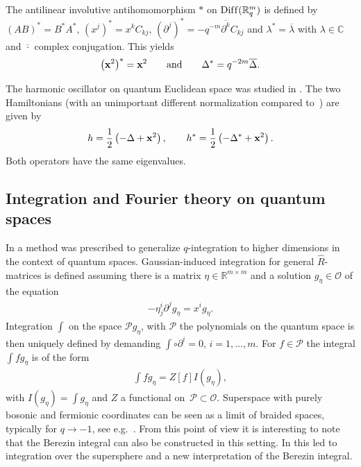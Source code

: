 \documentclass[11pt]{article}
\newcommand{\mR}{\mathbb{R}}
\newcommand{\mC}{\mathbb{C}}
\newcommand{\cP}{\mathcal{P}}
\newcommand{\cO}{\mathcal{O}}
\numberwithin{equation}{section}
\begin{document}
The antilinear involutive antihomomorphism $\ast$ on ${\rm Dif\/f}(\mR^m_q)$ is def\/ined by $(AB)^\ast=B^\ast A^\ast$, $(x^j)^\ast=x^kC_{kj}$,  $(\partial^j)^\ast=-q^{-m}\overline{\partial^k}C_{kj}$ and $\lambda^\ast=\overline{\lambda}$ with $\lambda\in\mC$ and $\overline{\cdot}$ complex conjugation. This yields
\begin{gather*}
\big(\bold{x}^2\big)^\ast=\bold{x}^2 \qquad \mbox{and}\qquad \Delta^\ast=q^{-2m}\overline{\Delta}.
\end{gather*}

The harmonic oscillator on quantum Euclidean space was studied in \cite{MR1097174, MR1288667, MR1239953}. The two Hamiltonians (with an unimportant dif\/ferent normalization compared to~\cite{MR1239953}) are given by
\begin{gather}
\label{HOs}
h=\frac{1}{2}\left(-\Delta+\bold{x}^2\right),\qquad h^\ast=\frac{1}{2}\left(-{\Delta}^\ast+\bold{x}^2\right).
\end{gather}
Both operators have the same eigenvalues.


\subsection{Integration and Fourier theory on quantum spaces}
In \cite{MR1303081} a method was prescribed to generalize $q$-integration to higher dimensions in the context of quantum spaces. Gaussian-induced integration for general $\hat{R}$-matrices is def\/ined assuming there is a matrix $\eta\in\mR^{m\times m}$ and a solution $g_{\eta}\in\cO$ of the equation
\begin{gather}
\label{Gaussian}
-\eta^i_{ j}\partial^jg_{\eta}=x^i g_\eta.
\end{gather}
Integration $\int$ on the space $\cP g_{\eta}$, with $\cP$ the polynomials on the quantum space is then uniquely def\/ined by demanding $\int\circ \partial^i =0$, $i=1,\dots,m$. For $f\in\cP$ the integral $\int f g_{\eta}$ is of the form
\begin{gather}
\label{Gaussian2}
\int fg_{\eta}=Z[f]I(g_\eta),
\end{gather}
with $I(g_\eta)=\int g_\eta$ and $Z$ a functional on~$\cP\subset\cO$. Superspace with purely bosonic and fermionic coordinates can be seen as a limit of braided spaces, typically for $q\to-1$, see e.g.~\cite{MR1413908}. From this point of view it is interesting to note that the Berezin integral can also be constructed in this setting. In \cite{DBS5, MR2539324} this led to integration over the supersphere and a new interpretation of the Berezin integral.
\end{document}
